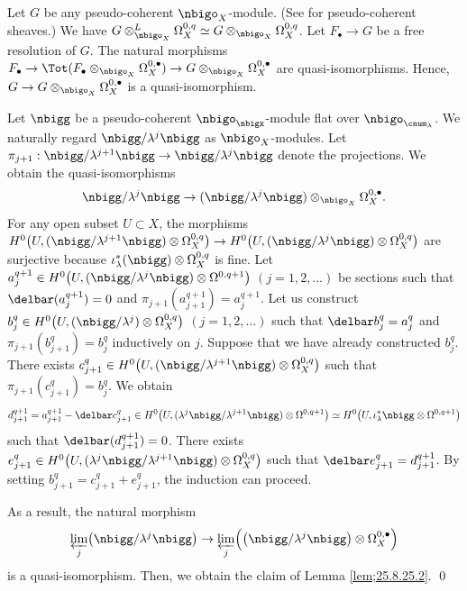 \documentclass[a4,10pt]{article}
\begin{document}
Let $G$ be any pseudo-coherent $\nbigo_X$-module.
(See \cite[Appendix A]{kashiwara_text}
for pseudo-coherent sheaves.)
We have
$G\otimes^L_{\nbigo_X}\Omega^{0,q}_X
\simeq
G\otimes_{\nbigo_X}\Omega^{0,q}_X$.
Let $F_{\bullet}\to G$ be a free resolution of $G$.
The natural morphisms
$F_{\bullet}\to
\Tot(F_{\bullet}\otimes_{\nbigo_X}\Omega^{0,\bullet}_X)
\to G\otimes_{\nbigo_X}\Omega^{0,\bullet}_X$
are quasi-isomorphisms.
Hence, 
$G\to G\otimes_{\nbigo_X}\Omega^{0,\bullet}_X$
is a quasi-isomorphism.

Let $\nbigg$ be a pseudo-coherent $\nbigo_{\nbigx}$-module
flat over $\nbigo_{\cnum_{\lambda}}$.
We naturally regard $\nbigg/\lambda^j\nbigg$
as $\nbigo_X$-modules.
Let $\pi_{j+1}:\nbigg/\lambda^{j+1}\nbigg\to\nbigg/\lambda^j\nbigg$
denote the projections.
We obtain the quasi-isomorphisms
\[
 \nbigg/\lambda^j\nbigg
 \to
 (\nbigg/\lambda^j\nbigg)\otimes_{\nbigo_X}\Omega_X^{0,\bullet}.
\]
For any open subset $U\subset X$,
the morphisms
$H^0\bigl(U,(\nbigg/\lambda^{j+1}\nbigg)\otimes\Omega^{0,q}_X\bigr)
 \to
 H^0\bigl(U,(\nbigg/\lambda^{j}\nbigg)\otimes\Omega^{0,q}_X\bigr)$
are surjective
because $\iota_{\lambda}^{\ast}(\nbigg)\otimes\Omega^{0,q}_X$ is fine.
Let $a_j^{q+1}\in
H^0\bigl(U,(\nbigg/\lambda^j\nbigg)\otimes\Omega^{0,q+1}\bigr)$ $
(j=1,2,\ldots)$
be sections such that
$\delbar(a_j^{q+1})=0$
and $\pi_{j+1}(a_{j+1}^{q+1})=a_j^{q+1}$.
Let us construct
$b_j^q\in H^0\bigl(U,(\nbigg/\lambda^j)\otimes\Omega^{0,q}_X\bigr)$
$(j=1,2,\ldots)$
such that
$\delbar b_j^q=a_j^q$
and $\pi_{j+1}(b_{j+1}^q)=b_j^q$
inductively on $j$.
Suppose that we have already constructed $b_{j}^q$.
There exists
$c_{j+1}^q\in H^0\bigl(U,(\nbigg/\lambda^{j+1}\nbigg)\otimes\Omega^{0,q}_X
\bigr)$
such that
$\pi_{j+1}(c_{j+1}^q)=b_j^q$.
We obtain
\[
d_{j+1}^{q+1}=a_{j+1}^{q+1}-\delbar c_{j+1}^q
\in
H^0\bigl(U,
 (\lambda^j\nbigg/\lambda^{j+1}\nbigg)
 \otimes\Omega^{0,q+1}
\bigr)
\simeq H^0\bigl(U,
 \iota_{\lambda}^{\ast}\nbigg
 \otimes\Omega^{0,q+1}
\bigr)
\]
such that
$\delbar(d_{j+1}^{q+1})=0$.
There exists
$e_{j+1}^q\in
H^0\bigl(U,(\lambda^j\nbigg/\lambda^{j+1}\nbigg)\otimes
\Omega^{0,q}_X\bigr)$
such that
$\delbar e_{j+1}^q=d_{j+1}^{q+1}$.
By setting $b_{j+1}^q=c_{j+1}^q+e_{j+1}^q$,
the induction can proceed.

As a result,
the natural morphism 
\[
 \varprojlim_{j}\bigl(
 \nbigg/\lambda^j\nbigg
 \bigr)
 \to
 \varprojlim_{j}
 \Bigl(
 \bigl(
 \nbigg/\lambda^j\nbigg
 \bigr)
 \otimes\Omega^{0,\bullet}_X
 \Bigr)
\]
is a quasi-isomorphism.
Then, we obtain the claim of Lemma \ref{lem;25.8.25.2}.
\hfill\qed
\end{document}
